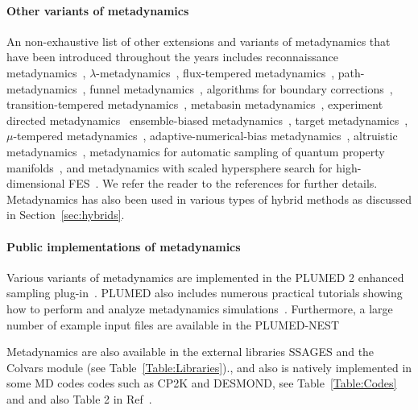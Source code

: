 \documentclass[9pt,review]{livecoms}
\begin{document}
\paragraph{Other variants of metadynamics}
\label{sec:metad_variants}
An non-exhaustive list of other extensions and variants of metadynamics that have been introduced throughout the years includes
reconnaissance metadynamics~\cite{10.1073/pnas.1011511107},
$\lambda$-metadynamics~\cite{10.1021/jz200808x},
flux-tempered metadynamics~\cite{Singh-JStatPhys-2011,Singh-JCTC-2012},
path-metadynamics~\cite{10.1103/physrevlett.109.020601,10.1063/1.5027392},
funnel metadynamics~\cite{10.1073/pnas.1303186110,10.1038/s41596-020-0342-4},
algorithms for boundary corrections~\cite{McGovern-JCP-2013},
transition-tempered metadynamics~\cite{Dama-JCTC-2014}, metabasin metadynamics~\cite{10.1021/acs.jctc.5b00907},
experiment directed metadynamics~\cite{White_EDM_2015}
ensemble-biased metadynamics~\cite{Marinelli_EnsembleBiased_2015},
target metadynamics~\cite{GilLey_TargetMetaD_2016},
$\mu$-tempered metadynamics~\cite{10.1063/1.4937939},
adaptive-numerical-bias metadynamics~\cite{10.1002/jcc.25066},
altruistic metadynamics~\cite{10.1021/acs.jpcb.6b00087,10.1063/1.4978939},
metadynamics for automatic sampling of quantum property manifolds~\cite{Lindner_ASQPM-MetaD_2019},
and
metadynamics with scaled hypersphere search for high-dimensional FES~\cite{Mitsuta_SHS-MetaD_JCTC2020}.
We refer the reader to the references for further details. Metadynamics has also been used in various types of hybrid methods as discussed in Section~\ref{sec:hybrids}.

\paragraph{Public implementations of metadynamics}
\label{sec:meta-impl}
Various variants of metadynamics are implemented in the PLUMED 2 enhanced sampling plug-in~\cite{Bonomi-CPC-2009,Tribello2014,plumed-nest}. PLUMED also includes numerous practical tutorials showing how to perform and analyze metadynamics simulations~\cite{plumed_masterclass}. Furthermore, a large number of example input files are
available in the PLUMED-NEST~\cite{plumed-nest,plumed_nest_url}

Metadynamics are also available in the external libraries SSAGES and the Colvars module (see Table~\ref{Table:Libraries})., and also is natively implemented in some MD codes codes such as CP2K and DESMOND, see Table~\ref{Table:Codes} and and also Table 2 in Ref~\cite{BussiLaio_ReviewMetaD_2020}. 
\end{document}
